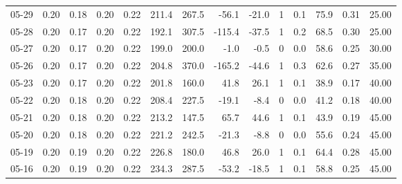 \begin{threeparttable}
{\begin{tabular}{lrrrrrrrrrrrrr}
  05-29 &          0.20 &          0.18 &          0.20 &        0.22 &               211.4 &               267.5 &      -56.1 &        -21.0 &              1 &                 0.1 &             75.9 &            0.31 &                  25.00 \\
  05-28 &          0.20 &          0.17 &          0.20 &        0.22 &               192.1 &               307.5 &     -115.4 &        -37.5 &              1 &                 0.2 &             68.5 &            0.30 &                  25.00 \\
  05-27 &          0.20 &          0.17 &          0.20 &        0.22 &               199.0 &               200.0 &       -1.0 &         -0.5 &              0 &                 0.0 &             58.6 &            0.25 &                  30.00 \\
  05-26 &          0.20 &          0.17 &          0.20 &        0.22 &               204.8 &               370.0 &     -165.2 &        -44.6 &              1 &                 0.3 &             62.6 &            0.27 &                  35.00 \\
  05-23 &          0.20 &          0.17 &          0.20 &        0.22 &               201.8 &               160.0 &       41.8 &         26.1 &              1 &                 0.1 &             38.9 &            0.17 &                  40.00 \\
  05-22 &          0.20 &          0.18 &          0.20 &        0.22 &               208.4 &               227.5 &      -19.1 &         -8.4 &              0 &                 0.0 &             41.2 &            0.18 &                  40.00 \\
  05-21 &          0.20 &          0.18 &          0.20 &        0.22 &               213.2 &               147.5 &       65.7 &         44.6 &              1 &                 0.1 &             43.9 &            0.19 &                  45.00 \\
  05-20 &          0.20 &          0.18 &          0.20 &        0.22 &               221.2 &               242.5 &      -21.3 &         -8.8 &              0 &                 0.0 &             55.6 &            0.24 &                  45.00 \\
  05-19 &          0.20 &          0.19 &          0.20 &        0.22 &               226.8 &               180.0 &       46.8 &         26.0 &              1 &                 0.1 &             64.4 &            0.28 &                  45.00 \\
  05-16 &          0.20 &          0.19 &          0.20 &        0.22 &               234.3 &               287.5 &      -53.2 &        -18.5 &              1 &                 0.1 &             58.8 &            0.25 &                  45.00 \\

\end{tabular}}
\end{threeparttable}
